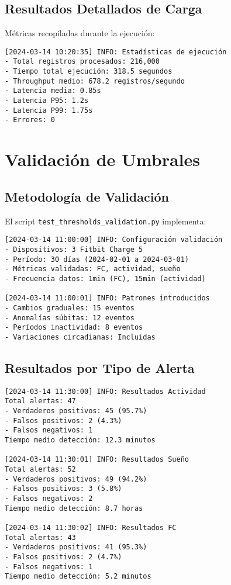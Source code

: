 \subsection{Resultados Detallados de Carga}

Métricas recopiladas durante la ejecución:

\begin{verbatim}
[2024-03-14 10:20:35] INFO: Estadísticas de ejecución
- Total registros procesados: 216,000
- Tiempo total ejecución: 318.5 segundos
- Throughput medio: 678.2 registros/segundo
- Latencia media: 0.85s
- Latencia P95: 1.2s
- Latencia P99: 1.75s
- Errores: 0
\end{verbatim}

\section{Validación de Umbrales}
\label{anexo:pruebas:umbrales}

\subsection{Metodología de Validación}

El script \texttt{test\_thresholds\_validation.py} implementa:

\begin{verbatim}
[2024-03-14 11:00:00] INFO: Configuración validación
- Dispositivos: 3 Fitbit Charge 5
- Período: 30 días (2024-02-01 a 2024-03-01)
- Métricas validadas: FC, actividad, sueño
- Frecuencia datos: 1min (FC), 15min (actividad)

[2024-03-14 11:00:01] INFO: Patrones introducidos
- Cambios graduales: 15 eventos
- Anomalías súbitas: 12 eventos
- Períodos inactividad: 8 eventos
- Variaciones circadianas: Incluidas
\end{verbatim}

\subsection{Resultados por Tipo de Alerta}

\begin{verbatim}
[2024-03-14 11:30:00] INFO: Resultados Actividad
Total alertas: 47
- Verdaderos positivos: 45 (95.7%)
- Falsos positivos: 2 (4.3%)
- Falsos negativos: 1
Tiempo medio detección: 12.3 minutos

[2024-03-14 11:30:01] INFO: Resultados Sueño
Total alertas: 52
- Verdaderos positivos: 49 (94.2%)
- Falsos positivos: 3 (5.8%)
- Falsos negativos: 2
Tiempo medio detección: 8.7 horas

[2024-03-14 11:30:02] INFO: Resultados FC
Total alertas: 43
- Verdaderos positivos: 41 (95.3%)
- Falsos positivos: 2 (4.7%)
- Falsos negativos: 1
Tiempo medio detección: 5.2 minutos
\end{verbatim}

